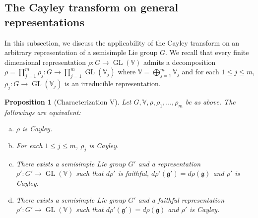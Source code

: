 \documentclass[11pt,reqno]{amsart}
\DeclareMathOperator{\GL}{GL}
\newtheorem{proposition}[theorem]{Proposition}
\begin{document}
\subsection{The Cayley transform on general representations}
In this subsection,  we discuss the applicability of the Cayley transform on an arbitrary representation of a semisimple Lie group $G$.  We recall that every finite dimensional representation $\rho: G \to \GL(\mathbb{V})$ admits a decomposition $\rho = \prod_{j=1}^m \rho_j: G \to \prod_{j=1}^m \GL(\mathbb{V}_j)$ where $\mathbb{V} = \bigoplus_{j=1}^m \mathbb{V}_j$ and for each $1 \le j \le m$,  $\rho_j: G \to \GL(\mathbb{V}_j)$ is an irreducible representation.
\begin{proposition}[Characterization V]\label{prop:reducible+faithful}
Let $G,  \mathbb{V}, \rho,  \rho_1,\dots,  \rho_m$ be as above.  The followings are equivalent: 
\begin{enumerate}[(a)]
\item $\rho$ is Cayley.    \label{prop:reducible+faithful:item1}
\item For each $1 \le j \le m$,  $\rho_j$ is Cayley.  \label{prop:reducible+faithful:item3}
\item There exists a semisimple Lie group $G'$ and a representation $\rho': G' \to \GL(\mathbb{V})$ such that $d\rho'$ is faithful,  $d\rho' (\mathfrak{g}') = d\rho (\mathfrak{g})$ and $\rho'$ is Cayley.   \label{prop:reducible+faithful:item2}
\item There exists a semisimple Lie group $G'$ and a faithful representation $\rho': G' \to \GL(\mathbb{V})$ such that $d\rho' (\mathfrak{g}') = d\rho (\mathfrak{g})$ and $\rho'$ is Cayley.   
\label{prop:reducible+faithful:item4}
\end{enumerate}
\end{proposition}
\end{document}
